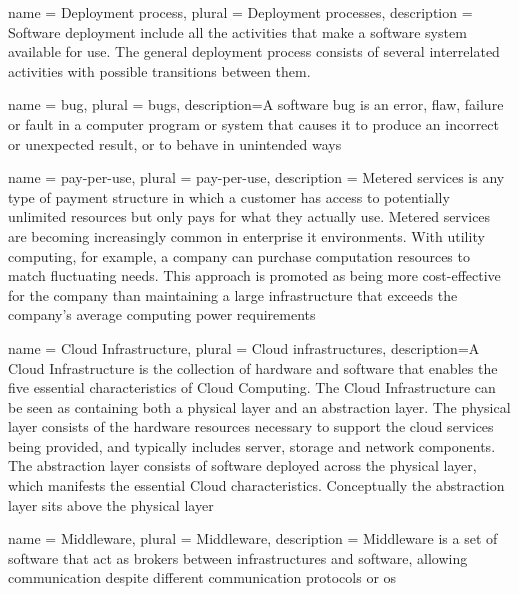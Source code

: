 %
%
{
	name = {Deployment process},
	plural = {Deployment processes},
	description = {Software deployment include all the activities that make a software system available
		for use. The general deployment process consists of several interrelated activities with possible
		transitions between them.}
}

{
	name = {bug},
	plural = {bugs},
	description={A software bug is an error, flaw, failure or fault in a computer program or system that
		 causes it to produce an incorrect or unexpected result, or to behave in unintended ways}
}

{
	name = {pay-per-use},
	plural = {pay-per-use},
	description = {Metered services is any type of payment structure in which
		a customer has access to potentially unlimited resources but only pays for what they actually use.
		Metered services are becoming increasingly common in enterprise \acs{it} environments. With utility
		computing, for example, a company can purchase computation resources to  match fluctuating needs.
		This approach is promoted as being more cost-effective for the company than maintaining a large
		infrastructure that exceeds the company's average computing power requirements}
}

{
	name = {Cloud Infrastructure},
	plural = {Cloud infrastructures},
	description={A Cloud Infrastructure is the collection of hardware and
		software that enables the five essential characteristics of Cloud Computing. The Cloud Infrastructure
		can be seen as containing both a physical layer and an abstraction layer. The physical layer consists
		of the hardware resources necessary to support the cloud services being provided, and typically
		includes server, storage and network components. The abstraction layer consists of software deployed
		across the physical layer, which manifests the essential Cloud characteristics. Conceptually the
		abstraction layer sits above the physical layer}
}

{
	name = {Middleware},
	plural = {Middleware},
	description = {Middleware is a set of software that act as brokers between infrastructures and software,
		allowing communication despite different communication protocols or \acs{os}}
}

